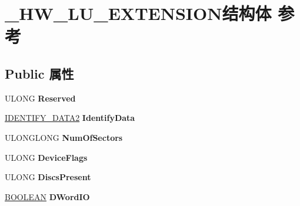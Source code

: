 \hypertarget{struct___h_w___l_u___e_x_t_e_n_s_i_o_n}{}\section{\+\_\+\+H\+W\+\_\+\+L\+U\+\_\+\+E\+X\+T\+E\+N\+S\+I\+O\+N结构体 参考}
\label{struct___h_w___l_u___e_x_t_e_n_s_i_o_n}
\subsection*{Public 属性}
\begin{DoxyCompactItemize}
\item 
\mbox{\label{struct___h_w___l_u___e_x_t_e_n_s_i_o_n_ad1aa71787ecef8146cc660226b541e18}} 
U\+L\+O\+NG {\bfseries Reserved}
\item 
\mbox{\label{struct___h_w___l_u___e_x_t_e_n_s_i_o_n_a58b69e6e4a47816c5e373752f6d4dc54}} 
\hyperlink{struct___i_d_e_n_t_i_f_y___d_a_t_a2}{I\+D\+E\+N\+T\+I\+F\+Y\+\_\+\+D\+A\+T\+A2} {\bfseries Identify\+Data}
\item 
\mbox{\label{struct___h_w___l_u___e_x_t_e_n_s_i_o_n_a35855a836a98c4133629f2264100f8e2}} 
U\+L\+O\+N\+G\+L\+O\+NG {\bfseries Num\+Of\+Sectors}
\item 
\mbox{\label{struct___h_w___l_u___e_x_t_e_n_s_i_o_n_a1cac4100393131864e0e146000bcbed7}} 
U\+L\+O\+NG {\bfseries Device\+Flags}
\item 
\mbox{\label{struct___h_w___l_u___e_x_t_e_n_s_i_o_n_aa458128b768d076c3abb6826bfea4731}} 
U\+L\+O\+NG {\bfseries Discs\+Present}
\item 
\mbox{\label{struct___h_w___l_u___e_x_t_e_n_s_i_o_n_a2edae8e68a02a67c5c855edf5b0e2baf}} 
\hyperlink{_processor_bind_8h_a112e3146cb38b6ee95e64d85842e380a}{B\+O\+O\+L\+E\+AN} {\bfseries D\+Word\+IO}
\item 
\mbox{\label{struct___h_w___l_u___e_x_t_e_n_s_i_o_n_aebd8bee697b219b8d744794f14d5a5bc}} 

\end{DoxyCompactItemize}
